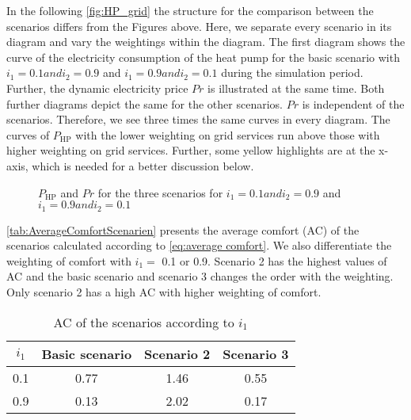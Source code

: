 In the following \autoref{fig:HP_grid} the structure for the comparison between the scenarios differs from the Figures above. Here, we separate every scenario in its diagram and vary the weightings within the diagram. The first diagram shows the curve of the electricity consumption of the heat pump for the basic scenario with $i_\text{1} = 0.1 and i_\text{2} = 0.9$ and $i_\text{1} = 0.9 and i_\text{2} = 0.1$ during the simulation period. Further, the dynamic electricity price $Pr$ is illustrated at the same time. Both further diagrams depict the same for the other scenarios. $Pr$ is independent of the scenarios. Therefore, we see three times the same curves in every diagram. The curves of $P_\text{HP}$ with the lower weighting on grid services run above those with higher weighting on grid services. Further, some yellow highlights are at the x-axis, which is needed for a better discussion below. 
    \begin{figure}[H]
           \centering
        \def\svgwidth{0.9\textwidth}
        
        \caption{$P_\text{HP}$ and $Pr$ for the three scenarios for $i_\text{1} = 0.1 and i_\text{2} = 0.9$ and $i_\text{1} = 0.9 and i_\text{2} = 0.1$}
         \label{fig:HP_grid}
    \end{figure}
    
\autoref{tab:AverageComfortScenarien} presents the average comfort (AC) of the scenarios calculated according to \autoref{eq:average comfort}. We also differentiate the weighting of comfort with $i_\text{1} =$ 0.1 or 0.9. Scenario 2 has the highest values of AC and the basic scenario and scenario 3 changes the order with the weighting. Only scenario 2 has a high AC with higher weighting of comfort.  
    \begin{table}[H]
        \centering
        \begin{tabular}{c||c|c|c}
          $i_\text{1}$  &  Basic scenario & Scenario 2 & Scenario 3\\
          \hline  \hline
             0.1 & 0.77 & 1.46 & 0.55\\
             0.9 & 0.13 & 2.02 & 0.17\\
        \end{tabular}
        \caption{AC of the scenarios according to $i_\text{1}$}
        \label{tab:AverageComfortScenarien}
    \end{table}
    
